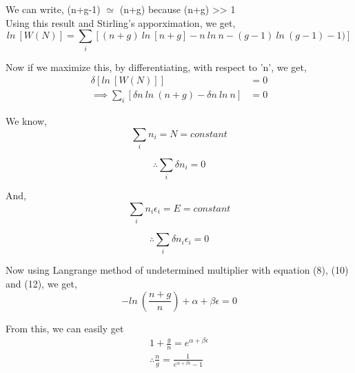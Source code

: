 \documentclass[12pt, letterpaper]{article}
\begin{document}
    We can write, 
    (n+g-1) $\simeq$ (n+g)
    because (n+g) >> 1 \\ 

    Using this result and Stirling's apporximation, we get, 
    \begin{equation}
        ln \ [W(N)] =\sum_{i}  [(n+g) \  ln \ [n+g] - n \ ln \ n  -(g-1) \ ln \ (g-1) -1)]
    \end{equation}

    Now if we maximize this, by differentiating, with respect to 'n', we get,  
    \begin{equation}
        \begin{split}
        \delta  [ln \ [W(N)]] & = 0 \\ 
        \implies \sum _{i} [\delta n \ ln \ (n+g) - \delta n \ ln \ n] &  = 0
        \end{split}
    \end{equation}

    We know,
    \begin{equation}
        \sum_{i} n_{i} = N = constant
    \end{equation}

    \begin{equation}
        \therefore \sum_{i} \delta n_{i} = 0
    \end{equation}


    And, 
    \begin{equation}
        \sum_{i} n_{i} \epsilon _{i}= E = constant
    \end{equation}

    \begin{equation}
        \therefore \sum_{i} \delta n_{i} \epsilon _{i} = 0
    \end{equation}

    Now using Langrange method of undetermined multiplier with equation (8), (10) and (12), we get,
    \begin{equation}
        -ln \ (\frac{n+g}{n}) + \alpha +\beta \epsilon = 0
    \end{equation}

    From this, we can easily get
    \begin{equation}
        \begin{split}
        1 + \frac{g}{n} = e^{\alpha +\beta \epsilon} \\
        \therefore \frac{n}{g} = \frac{1}{e^{\alpha + \beta \epsilon} - 1}    
    \end{split}
    \end{equation}
\end{document}

